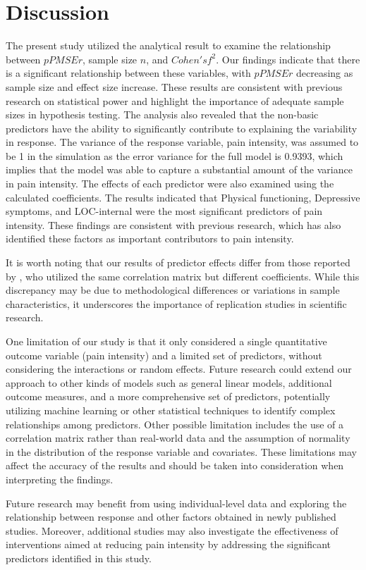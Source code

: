 \chapter{Discussion}

The present study utilized the analytical result to examine the relationship between $pPMSEr$, sample size $n$, and $Cohen's f^2$. Our findings indicate that there is a significant relationship between these variables, with $pPMSEr$ decreasing as sample size and effect size increase. These results are consistent with previous research on statistical power and highlight the importance of adequate sample sizes in hypothesis testing.
The analysis also revealed that the non-basic predictors have the ability to significantly contribute to explaining the variability in response. The variance of the response variable, pain intensity, was assumed to be 1 in the simulation as the error variance for the full model is 0.9393, which implies that the model was able to capture a substantial amount of the variance in pain intensity.
The effects of each predictor were also examined using the calculated coefficients. The results indicated that Physical functioning, Depressive symptoms, and LOC-internal were the most significant predictors of pain intensity. These findings are consistent with previous research, which has also identified these factors as important contributors to pain intensity.

It is worth noting that our results of predictor effects differ from those reported by \cite{baker2008chronicpain}, who utilized the same correlation matrix but different coefficients. While this discrepancy may be due to methodological differences or variations in sample characteristics, it underscores the importance of replication studies in scientific research.

One limitation of our study is that it only considered a single quantitative outcome variable (pain intensity) and a limited set of predictors, without considering the interactions or random effects. Future research could extend our approach to other kinds of models such as general linear models, additional outcome measures, and a more comprehensive set of predictors, potentially utilizing machine learning or other statistical techniques to identify complex relationships among predictors. Other possible limitation includes the use of a correlation matrix rather than real-world data and the assumption of normality in the distribution of the response variable and covariates. These limitations may affect the accuracy of the results and should be taken into consideration when interpreting the findings.


Future research may benefit from using individual-level data and exploring the relationship between response and other factors obtained in newly published studies. Moreover, additional studies may also investigate the effectiveness of interventions aimed at reducing pain intensity by addressing the significant predictors identified in this study.


